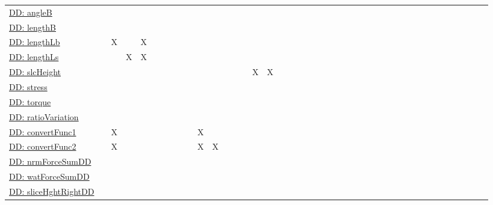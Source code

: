\documentclass[12pt]{article}
\begin{document}
\begin{longtable}{l l l l l l l l l l l l l l l l l l l l l l l l l l l l l l l l l l l l l l l l l l}
\\
\hyperref[DD:angleB]{DD: angleB} &  &  &  &  &  &  &  &  &  &  &  &  &  &  &  &  &  &  &  &  &  &  &  &  &  &  &  &  &  &  &  &  &  &  &  &  &  &  &  &  & 
\\
\hyperref[DD:lengthB]{DD: lengthB} &  &  &  &  &  &  &  &  &  &  &  &  &  &  &  &  &  &  &  &  &  &  &  &  &  &  &  &  &  &  &  &  &  &  &  &  &  &  &  &  & 
\\
\hyperref[DD:lengthLb]{DD: lengthLb} &  & X &  & X &  &  &  &  &  &  &  &  &  &  &  &  &  &  &  &  &  &  &  &  &  &  &  &  &  &  &  &  &  &  &  &  &  &  &  &  & 
\\
\hyperref[DD:lengthLs]{DD: lengthLs} &  &  & X & X &  &  &  &  &  &  &  &  &  &  &  &  &  &  &  &  &  &  &  &  &  &  &  &  &  &  &  &  &  &  &  &  &  &  &  &  & 
\\
\hyperref[DD:slcHeight]{DD: slcHeight} &  &  &  &  &  &  &  &  &  &  &  &  &  &  & X & X &  &  &  &  &  &  &  &  &  &  &  &  &  &  &  &  &  &  &  &  &  &  &  &  & 
\\
\hyperref[DD:stress]{DD: stress} &  &  &  &  &  &  &  &  &  &  &  &  &  &  &  &  &  &  &  &  &  &  &  &  &  &  &  &  &  &  &  &  &  &  &  &  &  &  &  &  & 
\\
\hyperref[DD:torque]{DD: torque} &  &  &  &  &  &  &  &  &  &  &  &  &  &  &  &  &  &  &  &  &  &  &  &  &  &  &  &  &  &  &  &  &  &  &  &  &  &  &  &  & 
\\
\hyperref[DD:ratioVariation]{DD: ratioVariation} &  &  &  &  &  &  &  &  &  &  &  &  &  &  &  &  &  &  &  &  &  &  &  &  &  &  &  &  &  &  &  &  &  &  &  &  &  &  &  &  & 
\\
\hyperref[DD:convertFunc1]{DD: convertFunc1} &  & X &  &  &  &  &  &  &  & X &  &  &  &  &  &  &  &  &  &  &  &  &  &  &  &  &  &  &  &  &  &  &  &  &  &  &  &  &  &  & 
\\
\hyperref[DD:convertFunc2]{DD: convertFunc2} &  & X &  &  &  &  &  &  &  & X & X &  &  &  &  &  &  &  &  &  &  &  &  &  &  &  &  &  &  &  &  &  &  &  &  &  &  &  &  &  & 
\\
\hyperref[DD:nrmForceSumDD]{DD: nrmForceSumDD} &  &  &  &  &  &  &  &  &  &  &  &  &  &  &  &  &  &  &  &  &  &  &  &  &  &  &  &  &  &  &  &  &  &  &  &  &  &  &  &  & 
\\
\hyperref[DD:watForceSumDD]{DD: watForceSumDD} &  &  &  &  &  &  &  &  &  &  &  &  &  &  &  &  &  &  &  &  &  &  &  &  &  &  &  &  &  &  &  &  &  &  &  &  &  &  &  &  & 
\\
\hyperref[DD:sliceHghtRightDD]{DD: sliceHghtRightDD} &  &  &  &  &  &  &  &  &  &  &  &  &  &  &  &  &  &  &  &  &  &  &  &  &  &  &  &  &  &  &  &  &  &  &  &  &  &  &  &  & 

\end{longtable}
\end{document}
